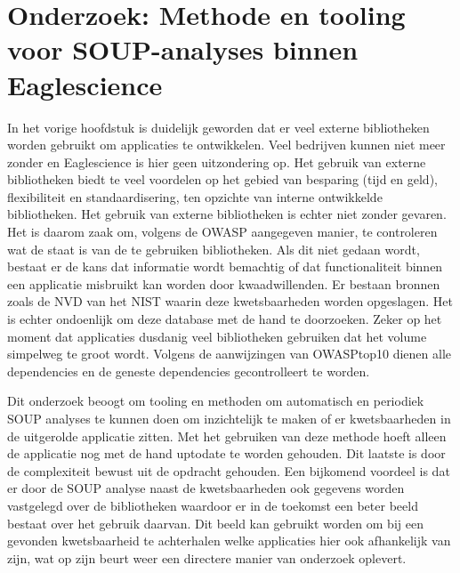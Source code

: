 \chapter{Onderzoek: Methode en tooling voor SOUP-analyses binnen Eaglescience}\label{ch:onderzoek-tool-methode}
In het vorige hoofdstuk is duidelijk geworden dat er veel externe bibliotheken worden gebruikt om applicaties te ontwikkelen. Veel bedrijven kunnen niet meer zonder en Eaglescience is hier geen uitzondering op. Het gebruik van externe bibliotheken biedt te veel voordelen op het gebied van besparing (tijd en geld), flexibiliteit en standaardisering, ten opzichte van interne ontwikkelde bibliotheken. Het gebruik van externe bibliotheken is echter niet zonder gevaren. Het is daarom zaak om, volgens de OWASP aangegeven manier, te controleren wat de staat is van de te gebruiken bibliotheken. Als dit niet gedaan wordt, bestaat er de kans dat informatie wordt bemachtig of dat functionaliteit binnen een applicatie misbruikt kan worden door kwaadwillenden. Er bestaan bronnen zoals de NVD van het NIST waarin deze kwetsbaarheden worden opgeslagen. Het is echter ondoenlijk om deze database met de hand te doorzoeken. Zeker op het moment dat applicaties dusdanig veel bibliotheken gebruiken dat het volume simpelweg te groot wordt. Volgens de aanwijzingen van OWASP\-top10 dienen alle dependencies en de geneste dependencies gecontrolleert te worden.

Dit onderzoek beoogt om tooling en methoden om automatisch en periodiek SOUP analyses te kunnen doen om inzichtelijk te maken of er kwetsbaarheden in de uitgerolde applicatie zitten. Met het gebruiken van deze methode hoeft alleen de applicatie nog met de hand up\-to\-date te worden gehouden. Dit laatste is door de complexiteit bewust uit de opdracht gehouden. Een bijkomend voordeel is dat er door de SOUP analyse naast de kwetsbaarheden ook gegevens worden vastgelegd over de bibliotheken waardoor er in de toekomst een beter beeld bestaat over het gebruik daarvan. Dit beeld kan gebruikt worden om bij een gevonden kwetsbaarheid te achterhalen welke applicaties hier ook afhankelijk van zijn, wat op zijn beurt weer een directere manier van onderzoek oplevert.

